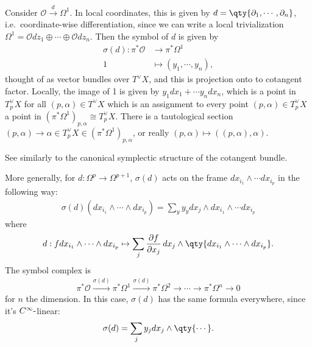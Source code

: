 \begin{example}[?]

Consider \({\mathcal{O}}\xrightarrow{d} \Omega^1\). In local
coordinates, this is given by
\(d = \qty{{\partial}_1, \cdots, {\partial}_n}\), i.e.~coordinate-wise
differentiation, since we can write a local trivialization
\(\Omega^1 = {\mathcal{O}}dz_1 \oplus \cdots \oplus {\mathcal{O}}dz_n\).
Then the symbol of \(d\) is given by
\begin{align*}
\sigma(d): \pi^* {\mathcal{O}}&\to \pi^* \Omega^1 \\
1 &\mapsto (y_1, \cdots, y_n) 
,\end{align*}
thought of as vector bundles over \(T^\vee X\), and this is projection
onto to cotangent factor. Locally, the image of 1 is given by
\(y_1 dx_1 + \cdots y_n dx_n\), which is a point in \(T_p^\vee X\) for
all \((p, \alpha) \in T^\vee X\) which is an assignment to every point
\((p, \alpha) \in T_p^\vee X\) a point in
\((\pi^* \Omega^1)_{p, \alpha} \cong T_p^\vee X\). There is a
tautological section
\((p, \alpha) \to \alpha\in T_p^\vee X\in (\pi^* \Omega^1)_{p, \alpha}\),
or really \((p, \alpha) \mapsto ( (p, \alpha), \alpha)\).

\end{example}

\begin{remark}

See similarly to the canonical symplectic structure of the cotangent
bundle.

\end{remark}

\begin{remark}

More generally, for \(d: \Omega^p \to \Omega^{p+1}\), \(\sigma(d)\) acts
on the frame \(dx_{i_1} \wedge \cdots dx_{i_p}\) in the following way:
\begin{align*}
\sigma(d)(dx_{i_1} \wedge \cdots \wedge dx_{i_p}) = \sum_y y_y dx_j \wedge dx_{i_1} \wedge \cdots dx_{i_p}
\end{align*}
where
\begin{align*}
d: fdx_{i_1} \wedge \cdots \wedge dx_{i_p} \mapsto \sum_j {\frac{\partial f}{\partial x_j}\,} dx_j \wedge \qty{dx_{i_1} \wedge \cdots \wedge dx_{i_p}}
.\end{align*}
The symbol complex is
\begin{align*}
\pi^* {\mathcal{O}}\xrightarrow{\sigma(d)} \pi^* \Omega^1 \xrightarrow{\sigma(d)} \pi^* \Omega^2 \to \cdots \to \pi^* \Omega^n \to 0
\end{align*}
for \(n\) the dimension. In this case, \(\sigma(d)\) has the same
formula everywhere, since it's \(C^ \infty {\hbox{-}}\)linear:
\begin{align*}
\sigma(d) = \sum_j y_j dx_j \wedge \qty{\cdots}
.\end{align*}

\end{remark}

